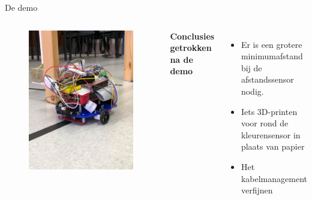 \documentclass[aspectratio=169,kulak,t,handout]{kulakbeamer} %
\begin{document}
\begin{frame}{\Large De demo}
\begin{columns}
	\centering
	
		\begin{figure}
			\centering
			\includegraphics[width=.5\textwidth]{demo}
			
			\label{fig:Demo}
		\end{figure}
	\centering
	{\bf{Conclusies getrokken na de demo}}\\[.2cm]
	
	\begin{itemize}
		\large\item Er is een grotere minimumafstand bij de afstandssensor nodig.
		\item Iets 3D-printen voor rond de kleurensensor in plaats van papier
		\item Het kabelmanagement verfijnen
	\end{itemize}
	
\end{columns}

	
\end{frame}
\end{document}
